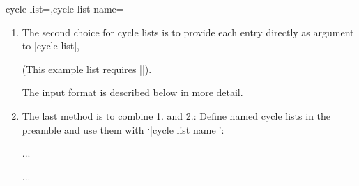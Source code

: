 \begin{pgfplotskeylist}{cycle list=,cycle list name=}
\begin{enumerate}
	\item The second choice for cycle lists is to provide each entry directly as argument to |cycle list|,
\begin{codeexample}[]
\end{codeexample}
	(This example list requires |\usetikzlibrary{plotmarks}|).

	The input format is described below in more detail.

	\item The last method is to combine 1. and 2.:  Define named cycle lists in the preamble and use them with `|cycle list name|':
\begin{command}{\pgfplotscreateplotcyclelist{}}%
\end{command}
\begin{codeexample}
...
\begin{axis}[cycle list name=mylist]
	...
\end{axis}
\end{codeexample}
\end{enumerate}


\end{pgfplotskeylist}
